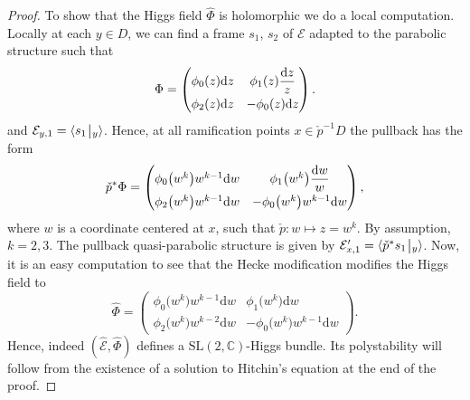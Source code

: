 \documentclass[pdftex]{sigma}
\numberwithin{equation}{section}
\theoremstyle{definition}
\newcommand{\rest}{\: \rule[-3.5pt]{0.5pt}{11.5pt}\,{}}
\newcommand{\calE}{\mathcal{E}}
\newcommand{\CC}{\mathbb{C}}
\renewcommand{\d}{\mathrm{d}}
\newcommand{\SL}{\mathrm{SL}}
\begin{document}
\begin{proof}
 To show that the Higgs field $\hat{\Phi}$ is holomorphic we do a local computation. Locally at each $y \in D$, we can find a frame $s_1$, $s_2$ of $\calE$ adapted to the parabolic structure such that
 \begin{align} \Phi= \begin{pmatrix} \phi_0(z) \d z & \phi_1(z) \dfrac{\d z}{z} \vspace{1mm}\\ \phi_2(z) \d z & -\phi_0(z) \d z \end{pmatrix}.
 \label{eq:local-model-Phi}
 \end{align}
 and $\calE_{y,1}=\langle s_1\rest_{y} \rangle$. Hence, at all ramification points $x \in \check{p}^{-1}D$ the pullback has the form
 \begin{align} \label{eq:local-model-Phi'}
 \check{p}^* \Phi= \begin{pmatrix} \phi_0\bigl(w^k\bigr) w^{k-1} \d w & \phi_1\bigl(w^k\bigr) \dfrac{ \d w}{w} \vspace{1mm}\\ \phi_2\bigl(w^k\bigr)w^{k-1} \d w & -\phi_0\bigl(w^k\bigr) w^{k-1} \d w \end{pmatrix},
 \end{align}
 where $w$ is a coordinate centered at $x$, such that $\check{p}\colon w \mapsto z=w^k$. By assumption, $k=2,3$. The pullback quasi-parabolic structure is given by $\calE'_{x,1}=\langle \check{p}^*s_1 \rest_y\rangle$. Now, it is an easy computation to see that the Hecke modification modifies the Higgs field to
 \[ \hat{\Phi} = \begin{pmatrix} \phi_0\bigl(w^k\bigr) w^{k-1} \d w & \phi_1\bigl(w^k\bigr) \d w \\[1mm] \phi_2\bigl(w^k\bigr)w^{k-2} \d w & -\phi_0\bigl(w^k\bigr) w^{k-1} \d w \end{pmatrix}.
 \]
 Hence, indeed $(\hat{\calE},\hat{\Phi})$ defines a $\SL(2,\CC)$-Higgs bundle. Its polystability will follow from the existence of a solution to Hitchin's equation at the end of the proof.


\end{proof}
\end{document}
